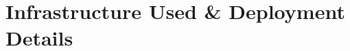 \documentclass[conference,final]{IEEEtran}
\begin{document}




\section{Infrastructure Used \& Deployment Details}
\end{document}
